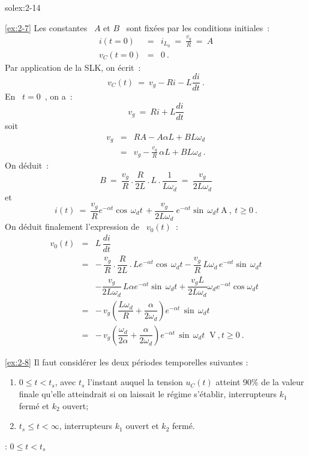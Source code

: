 \begin{exwithsol}{solex:2-14}
\begin{solexercise}{\ref{ex:2-7}}
Les constantes \ $A$ et $B$ \ sont fix\'ees par les conditions initiales~:
\begin{eqnarray*}
	i(t=0) &=& i_{L_0} \: = \: \frac{v_g}{R}\: = \: A\\
	v_C(t=0) &=& 0~.
\end{eqnarray*}
Par application de la SLK, on \'ecrit~:
\[ v_C(t) \: = \: v_g - Ri - L\dfrac{di}{dt}~. \]
En \ $t=0$~, on a~:
\[ v_g \: = \: Ri + L\dfrac{di}{dt} \]
soit
\begin{eqnarray*}
	v_g &=& RA - A\alpha L + BL\omega_d\\
	&=& v_g - \frac{v_g}{R} \, \alpha L + BL\omega_d~.
\end{eqnarray*}
On d\'eduit~:
\[ B \: = \: \dfrac{v_g}{R} \, . \, \dfrac{R}
{2L} \, . \,L \, . \, \dfrac{1}{L\omega_d} \: = \: \dfrac{v_g}{2L\omega_d} \] 
et
\[ i(t) \: = \: \dfrac{v_g}{R} e^{-\alpha t}  \cos \, \omega_d t \,  +
\dfrac{v_g}{2L\omega_d} \:  e^{-\alpha t}  \sin \, \omega_d t ~\mbox{A}~, ~t\geq 0~. \]
On d\'eduit finalement l'expression de \ $v_0(t)$~:
\begin{eqnarray*}
	v_0(t) &=& L \, \dfrac{di}{dt}\\[2mm]
	&=& -\, \dfrac{v_g}{R} \, . \, \dfrac{R}{2L} \, . \, L e^{-\alpha t} \cos \, \omega_d t 
	- \dfrac{v_g}{R} \, L\omega_d \, e^{-\alpha t} \sin \, \omega_d t\\[2mm]
	&&- \dfrac{v_g}{2L\omega_d} \, L \alpha  e^{-\alpha t} \sin\, \omega_d t 
	+ \dfrac{v_gL}{2L\omega_d}\omega_d e^{-\alpha t} \cos \omega_d t \\[2mm]
	&= & -\, v_g \left( \dfrac{L\omega_d}{R} + \dfrac{\alpha}{2\omega_d} \right) 
	e^{-\alpha t} \, \sin\, \omega_d t\\[2mm]
	&=& -\, v_g \left( \dfrac{\omega_d}{2\alpha} + 
	\dfrac{\alpha}{2\omega_d} \right) e^{-\alpha t} \, \sin\, \omega_d t ~\mbox{~V}~, t \geq 0~.
\end{eqnarray*}
\end{solexercise}

\begin{solexercise}{\ref{ex:2-8}}
	\label{solex:2-8}
Il faut consid\'erer les deux p\'eriodes temporelles suivantes :
\begin{enumerate}
	\item $0\leq t < t_s$, avec $t_s$ l'instant auquel la tension $u_C(t)$ atteint 90\% de la
	valeur finale qu'elle atteindrait si on laissait le r\'egime
	s'\'etablir, interrupteurs $k_1$ ferm\'e et $k_2$ ouvert;
	\item $t_s\leq t < \infty$, interrupteurs $k_1$ ouvert et $k_2$ ferm\'e.
\end{enumerate}
  : $0\leq t < t_s$


\end{solexercise}
\end{exwithsol}
